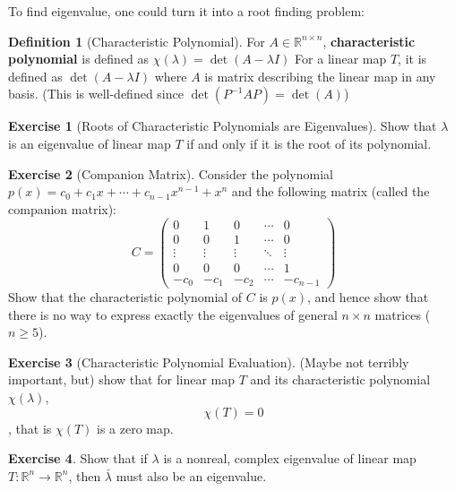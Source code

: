 \documentclass[12pt, a4paper]{article}
\newcommand{\R}{\mathbb{R}}
\theoremstyle{remark}
\theoremstyle{definition}
\newtheorem{definition}{Definition}
\newtheorem{exercise}{Exercise}
\numberwithin{equation}{section}
\numberwithin{definition}{section}
\numberwithin{example}{section}
\numberwithin{exercise}{section}
\numberwithin{remark}{section}
\numberwithin{figure}{section}
\begin{document}
To find eigenvalue, one could turn it into a root finding problem:
\begin{definition}[Characteristic Polynomial]
    For $A \in \R^{n \times n}$, \textbf{characteristic polynomial} is defined as $\chi ( \lambda ) = \det \left( A - \lambda I \right)$
    For a linear map $T$, it is defined as $\det \left( A - \lambda I \right)$ where $A$ is matrix describing the linear map in any basis. (This is well-defined since $\det \left( P^{-1} A P \right) = \det \left( A \right)$)
\end{definition}
\begin{exercise}[Roots of Characteristic Polynomials are Eigenvalues]
    Show that $\lambda$ is an eigenvalue of linear map $T$ if and only if it is the root of its polynomial.
\end{exercise}
\begin{exercise}[Companion Matrix]
    Consider the polynomial $p(x) = c_0 + c_1 x + \cdots + c_{n-1} x^{n-1} + x^n$ and the
    following matrix (called the companion matrix):
    \begin{equation*}
        C =
        \begin{pmatrix}
            0 & 1 & 0 & \cdots & 0 \\
            0 & 0 & 1 & \cdots & 0 \\
            \vdots & \vdots & \vdots & \ddots & \vdots \\
            0 & 0 & 0 & \cdots & 1 \\
            -c_0 & -c_1 & -c_2 & \cdots & -c_{n-1}
        \end{pmatrix}
    \end{equation*}
    Show that the characteristic polynomial of $C$ is $p(x)$, and hence show that there is no way to express exactly the eigenvalues of general $n \times n$ matrices ($n \geq 5$).
\end{exercise}
\begin{exercise}[Characteristic Polynomial Evaluation]
    (Maybe not terribly important, but) show that for linear map $T$ and its characteristic polynomial $\chi (\lambda)$,
    \begin{equation*}
        \chi (T) = 0
    \end{equation*},
    that is $\chi (T)$ is a zero map.
\end{exercise}
\begin{exercise}
    Show that if $\lambda$ is a nonreal, complex eigenvalue of linear map $T:\R^n \rightarrow \R^n$, then $\bar{\lambda}$ must also be an eigenvalue.
\end{exercise}
\end{document}
